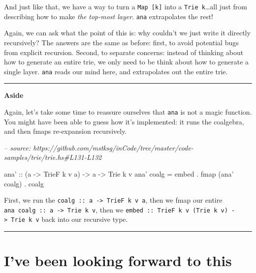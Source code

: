 \documentclass[]{article}
\newenvironment{Shaded}{}{}
\newcommand{\CommentTok}[1]{\textcolor[rgb]{0.38,0.63,0.69}{\textit{#1}}}
\newcommand{\DataTypeTok}[1]{\textcolor[rgb]{0.56,0.13,0.00}{#1}}
\newcommand{\FunctionTok}[1]{\textcolor[rgb]{0.02,0.16,0.49}{#1}}
\newcommand{\NormalTok}[1]{#1}
\newcommand{\OtherTok}[1]{\textcolor[rgb]{0.00,0.44,0.13}{#1}}
\begin{document}
And just like that, we have a way to turn a \texttt{Map\ {[}k{]}} into a
\texttt{Trie\ k}\ldots{}all just from describing how to make \emph{the top-most
layer}. \texttt{ana} extrapolates the rest!

Again, we can ask what the point of this is: why couldn't we just write it
directly recursively? The answers are the same as before: first, to avoid
potential bugs from explicit recursion. Second, to separate concerns: instead of
thinking about how to generate an entire trie, we only need to be think about
how to generate a single layer. \texttt{ana} reads our mind here, and
extrapolates out the entire trie.

\begin{center}\rule{0.5\linewidth}{\linethickness}\end{center}

\textbf{Aside}

Again, let's take some time to reassure ourselves that \texttt{ana} is not a
magic function. You might have been able to guess how it's implemented: it runs
the coalgebra, and then fmaps re-expansion recursively.

\begin{Shaded}
\begin{Highlighting}[]
\CommentTok{-- source: https://github.com/mstksg/inCode/tree/master/code-samples/trie/trie.hs#L131-L132}

\OtherTok{ana' ::}\NormalTok{ (a }\OtherTok{->} \DataTypeTok{TrieF}\NormalTok{ k v a) }\OtherTok{->}\NormalTok{ a }\OtherTok{->} \DataTypeTok{Trie}\NormalTok{ k v}
\NormalTok{ana' coalg }\FunctionTok{=}\NormalTok{ embed }\FunctionTok{.}\NormalTok{ fmap (ana' coalg) }\FunctionTok{.}\NormalTok{ coalg}
\end{Highlighting}
\end{Shaded}

First, we run the \texttt{coalg\ ::\ a\ -\textgreater{}\ TrieF\ k\ v\ a}, then
we fmap our entire \texttt{ana\ coalg\ ::\ a\ -\textgreater{}\ Trie\ k\ v}, then
we \texttt{embed\ ::\ TrieF\ k\ v\ (Trie\ k\ v)\ -\textgreater{}\ Trie\ k\ v}
back into our recursive type.

\begin{center}\rule{0.5\linewidth}{\linethickness}\end{center}

\hypertarget{ive-been-looking-forward-to-this}{%
\section{I've been looking forward to
this}\label{ive-been-looking-forward-to-this}}
\end{document}
